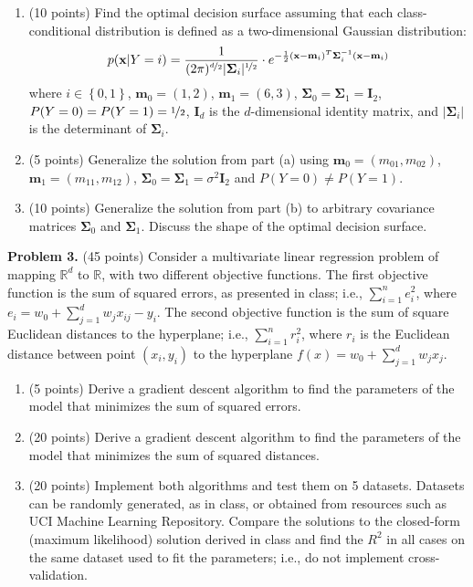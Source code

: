 \documentclass[twoside]{article}
\begin{document}
\begin{enumerate}
\item (10 points) Find the optimal decision surface assuming that each class-conditional distribution is defined as a two-dimensional Gaussian distribution:
\[
p(\mathbf{x}|Y=i)=\frac{1}{(2\pi)^{\nicefrac{d}{2}} |\mathbf{\Sigma}_{i}|^{\nicefrac{1}{2}}}\cdot e^{-\frac{1}{2}(\mathbf{x}-\mathbf{m}_{i})^{T}\mathbf{\Sigma}_{i}^{-1}(\mathbf{x}-\mathbf{m}_{i})}
\]
where $i \in \left\{ 0, 1\right\}$, $\mathbf{m}_{0}=(1,2)$, $\mathbf{m}_{1}=(6,3)$, $\mathbf{\Sigma}_{0}=\mathbf{\Sigma}_{1}=\mathbf{I}_2$, $P(Y=0)=P(Y=1)=\nicefrac{1}{2}$, $\mathbf{I}_d$ is the $d$-dimensional identity matrix, and $|\mathbf{\Sigma}_{i}|$ is the determinant of $\mathbf{\Sigma}_{i}$.
\item (5 points) Generalize the solution from part (a) using $\mathbf{m}_{0}=(m_{01}, m_{02})$, $\mathbf{m}_{1}=(m_{11}, m_{12})$, $\mathbf{\Sigma}_{0}=\mathbf{\Sigma}_{1}=\sigma^2 \mathbf{I}_2$ and $P(Y=0)\neq P(Y=1)$.
\item (10 points) Generalize the solution from part (b) to arbitrary covariance matrices $\mathbf{\Sigma}_{0}$ and $\mathbf{\Sigma}_{1}$. Discuss the shape of the optimal decision surface.
\end{enumerate}


\textbf{Problem 3.} (45 points) Consider a multivariate linear regression problem of mapping $\mathbb{R}^d$ to $\mathbb{R}$, with two different objective functions. The first objective function is the sum of squared errors, as presented in class; i.e., $\sum_{i=1}^{n}e_{i}^2$, where $e_i=w_0 + \sum_{j=1}^{d}w_jx_{ij} - y_i$. The second objective function is the sum of square Euclidean distances to the hyperplane; i.e., $\sum_{i=1}^{n}r_{i}^2$, where $r_i$ is the Euclidean distance between point $(x_i,y_i)$ to the hyperplane $f(x)=w_0 + \sum_{j=1}^{d}w_jx_j$.

\begin{enumerate}
\item (5 points) Derive a gradient descent algorithm to find the parameters of the model that minimizes the sum of squared errors. 

\item (20 points) Derive a gradient descent algorithm to find the parameters of the model that minimizes the sum of squared distances. 

\item (20 points) Implement both algorithms and test them on 5 datasets. Datasets can be randomly generated, as in class, or obtained from resources such as UCI Machine Learning Repository. Compare the solutions to the closed-form (maximum likelihood) solution derived in class and find the $R^2$ in all cases on the same dataset used to fit the parameters; i.e., do not implement cross-validation.
\end{enumerate}
\end{document}
